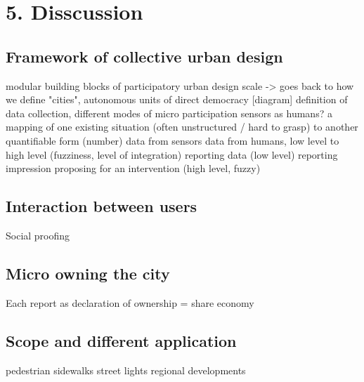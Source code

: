 \chapter{5. Disscussion}

\section{Framework of collective urban design}
modular building blocks of participatory urban design
scale -> goes back to how we define "cities", autonomous units of direct democracy
[diagram]
definition of data collection, different modes of micro participation
sensors as humans?
a mapping of one existing situation (often unstructured / hard to grasp) to another quantifiable form (number)
data from sensors
data from humans, low level to high level (fuzziness, level of integration)
reporting data (low level)
reporting impression
proposing for an intervention (high level, fuzzy)
\section{Interaction between users}
Social proofing
\section{Micro owning the city}
Each report as declaration of ownership = share economy
\section{Scope and different application}
pedestrian sidewalks
street lights
regional developments


